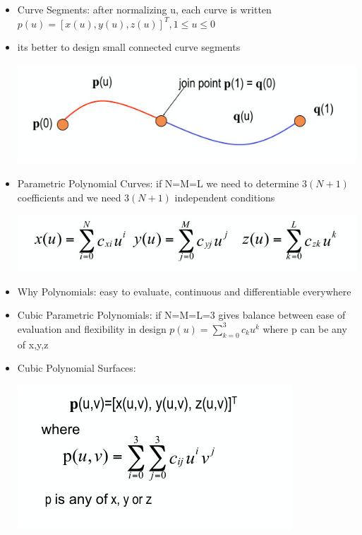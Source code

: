 \documentclass[11pt,a4paper]{article}
\begin{document}
\begin{itemize}
		\item Curve Segments: after normalizing u, each curve is written $p(u)=[x(u),y(u),z(u)]^{T}, 1 \leq u \leq 0$
		\item its better to design small connected curve segments
		\begin{center}
			\includegraphics[scale=0.5]{pictures/connectedcurvesegments.jpg}
		\end{center}
		\item Parametric Polynomial Curves: if N=M=L we need to determine $3(N+1)$ coefficients and we need $3(N+1)$ independent conditions
		\begin{center}
			\includegraphics[scale=0.5]{pictures/parametricpolynomialcurves.jpg}
		\end{center}
		\item Why Polynomials: easy to evaluate, continuous and differentiable everywhere
		\item Cubic Parametric Polynomials: if N=M=L=3 gives balance between ease of evaluation and flexibility in design $p(u) = \sum_{k=0}^{3} c_{k} u^{k}$ where p can be any of  x,y,z
		\item Cubic Polynomial Surfaces:
		\begin{center}
			\includegraphics[scale=0.5]{pictures/cubicpolynomialsurfaces.jpg}
		\end{center}
	\end{itemize}
\end{document}
